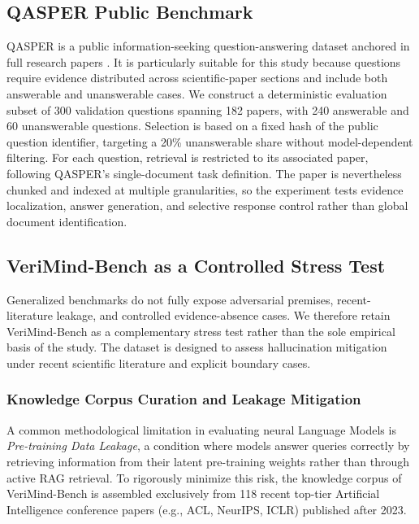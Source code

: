 \documentclass[smallextended]{svjour3}
\begin{document}
\subsection{QASPER Public Benchmark}
\label{subsec:qasper_dataset}

QASPER is a public information-seeking question-answering dataset anchored in full research papers \citep{dasigi2021dataset}. It is particularly suitable for this study because questions require evidence distributed across scientific-paper sections and include both answerable and unanswerable cases. We construct a deterministic evaluation subset of 300 validation questions spanning 182 papers, with 240 answerable and 60 unanswerable questions. Selection is based on a fixed hash of the public question identifier, targeting a 20\% unanswerable share without model-dependent filtering. For each question, retrieval is restricted to its associated paper, following QASPER's single-document task definition. The paper is nevertheless chunked and indexed at multiple granularities, so the experiment tests evidence localization, answer generation, and selective response control rather than global document identification.

\subsection{VeriMind-Bench as a Controlled Stress Test}
\label{subsec:verimind_bench}

Generalized benchmarks do not fully expose adversarial premises, recent-literature leakage, and controlled evidence-absence cases. We therefore retain VeriMind-Bench as a complementary stress test rather than the sole empirical basis of the study. The dataset is designed to assess hallucination mitigation \citep{ji2023survey} under recent scientific literature and explicit boundary cases.

\subsubsection{Knowledge Corpus Curation and Leakage Mitigation}
\label{subsec:corpus_curation}
A common methodological limitation in evaluating neural Language Models is \textit{Pre-training Data Leakage}, a condition where models answer queries correctly by retrieving information from their latent pre-training weights rather than through active RAG retrieval. To rigorously minimize this risk, the knowledge corpus of VeriMind-Bench is assembled exclusively from 118 recent top-tier Artificial Intelligence conference papers (e.g., ACL, NeurIPS, ICLR) published after 2023. 
\end{document}
